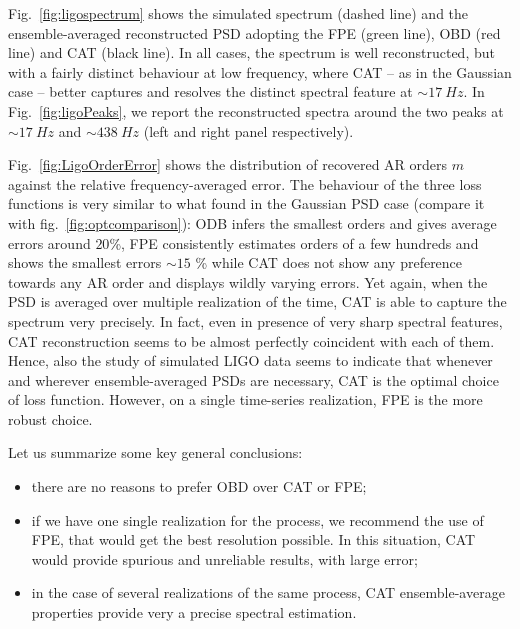 \documentclass{aa}
\begin{document}
Fig.~\ref{fig:ligospectrum} shows the simulated spectrum (dashed line) and the ensemble-averaged reconstructed PSD adopting the FPE (green line), OBD (red line) and CAT (black line).
In all cases, the spectrum is well reconstructed, but with a fairly distinct behaviour at low frequency, where CAT -- as in the Gaussian case -- better captures and resolves the distinct spectral feature at $\sim \SI{17}{Hz}$.
In Fig.~\ref{fig:ligoPeaks}, we report the reconstructed spectra around the two peaks at $\sim \SI{17}{Hz}$ and $\sim \SI{438}{Hz}$ (left and right panel respectively).

Fig.~\ref{fig:LigoOrderError} shows the distribution of recovered AR orders $m$ against the relative frequency-averaged error. The behaviour
of the three loss functions is very similar to what found in the Gaussian PSD case (compare it with fig.~\ref{fig:optcomparison}): ODB infers the smallest orders and gives average errors around $20$\%, FPE consistently estimates orders of a few hundreds and shows the smallest errors $\sim 15$ \% while CAT does not show any preference towards any AR order and displays wildly varying errors. Yet again, when the PSD is averaged over multiple realization of the time, CAT is able to capture the spectrum very precisely. In fact, even in presence of very sharp spectral features, CAT reconstruction seems to be almost perfectly coincident with each of them.
Hence, also the study of simulated LIGO data seems to indicate that whenever and wherever ensemble-averaged PSDs are necessary, CAT is the optimal choice of loss function. However, on a single time-series realization, FPE is the more robust choice.

Let us summarize some key general conclusions:
\begin{itemize}
	\item there are no reasons to prefer OBD over CAT or FPE;
	\item if we have one single realization for the process, we recommend the use of FPE, that would get the best resolution possible. In this situation, CAT would provide spurious and unreliable results, with large error;
	\item in the case of several realizations of the same process, CAT ensemble-average properties provide very a precise spectral estimation.\end{itemize}
\end{document}
